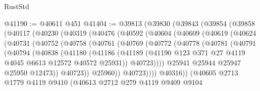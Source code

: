 \begin{lexlean}{RustStd}
\begin{coremodule}
@41190 := @40611 @451
@41404 := @39813
    (@39830
      (@39843
        (@39854
          (@39858
            (@40117
              (@40230
                (@40319
                  (@40476
                    (@40592
                      (@40604
                        (@40609
                          (@40619
                            (@40624
                              (@40731
                                (@40752
                                  (@40758
                                    (@40761
                                      (@40769
                                        (@40772
                                          (@40778
                                            (@40781
                                              (@40791
                                                (@40794
                                                  (@40838
                                                    (@41180
                                                      (@41186
                                                        (@41189
                                                          (@41190
                                                            @123
                                                            @371
                                                            @27
                                                            @4119
                                                            @4045
                                                            @6613
                                                            @12572
                                                            @40572
                                                            @25931))
                                                        @40723))))
                                                @25941
                                                @25944
                                                @25947
                                                @25950
                                                @12473))
                                            @40723))
                                        @25960))
                                    @40723))))
                            @40316))
                        (@40605
                          @2713
                          @1779
                          @4119
                          @9410
                          (@40613
                            @2712
                            @279
                            @4119
                            @9409
                            @9104

\end{coremodule}
\end{lexlean}
